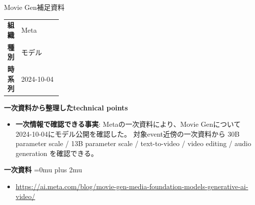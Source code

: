 \begin{technicalnote}{Movie Gen}{補足資料}
\begingroup
\begin{tabularx}{\linewidth}{@{}>{\bfseries}p{0.22\linewidth}X@{}}
組織 & Meta \\
種別 & モデル \\
時系列 & 2024-10-04 \\
\end{tabularx}
\smallskip
{\bfseries 一次資料から整理したtechnical points}
\begin{itemize}[leftmargin=1.5em,itemsep=0.35em]
\item \textbf{一次情報で確認できる事実}: Metaの一次資料により、Movie Genについて2024-10-04にモデル公開を確認した。 対象event近傍の一次資料から 30B parameter scale / 13B parameter scale / text-to-video / video editing / audio generation を確認できる。
\end{itemize}
\begin{minipage}{\linewidth}
\begin{samepage}
{\bfseries 一次資料}
\begingroup\sloppy
\Urlmuskip=0mu plus 2mu\relax
\begin{itemize}[leftmargin=1.5em,itemsep=0.25em]
\item {\scriptsize\url{https://ai.meta.com/blog/movie-gen-media-foundation-models-generative-ai-video/}}
\end{itemize}
\endgroup
\end{samepage}
\end{minipage}
\endgroup
\end{technicalnote}
\medskip

